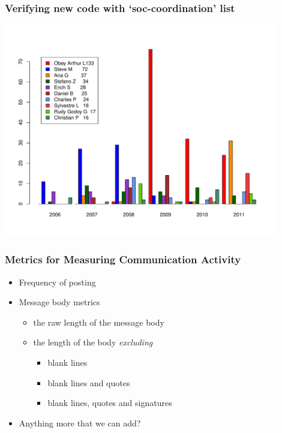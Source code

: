 \documentclass[compress]{beamer}
\begin{document}
\begin{frame}
  \frametitle{Verifying new code with `soc-coordination' list}
      \begin{center}
        \includegraphics[width=0.9\textwidth]{authorstat_soc-coordination}
      \end{center}
\end{frame}

\begin{frame}
 \frametitle{Metrics for Measuring Communication Activity}
 \begin{itemize}
    \item Frequency of posting 
    \pause
    \item Message body metrics 
    \begin{itemize}
        \item the raw length of the message body
        \pause
        \item the length of the body \textit{excluding}
        \begin{itemize}
            \item blank lines
            \pause
            \item blank lines and quotes
            \pause
            \item blank lines, quotes and signatures
            \pause
        \end{itemize}
    \end{itemize}
    \pause
    \item Anything more that we can add? 
 \end{itemize}
\end{frame}
\end{document}
